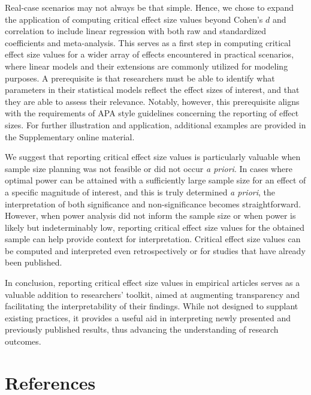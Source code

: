 \documentclass[
  man,floatsintext]{apa7}
\begin{document}
Real-case scenarios may not always be that simple. Hence, we chose to expand the application of computing critical effect size values beyond Cohen's \(d\) and correlation to include linear regression with both raw and standardized coefficients and meta-analysis. This serves as a first step in computing critical effect size values for a wider array of effects encountered in practical scenarios, where linear models and their extensions are commonly utilized for modeling purposes. A prerequisite is that researchers must be able to identify what parameters in their statistical models reflect the effect sizes of interest, and that they are able to assess their relevance. Notably, however, this prerequisite aligns with the requirements of APA style guidelines concerning the reporting of effect sizes. For further illustration and application, additional examples are provided in the Supplementary online material.

We suggest that reporting critical effect size values is particularly valuable when sample size planning was not feasible or did not occur \textit{a priori}. In cases where optimal power can be attained with a sufficiently large sample size for an effect of a specific magnitude of interest, and this is truly determined \textit{a priori}, the interpretation of both significance and non-significance becomes straightforward. However, when power analysis did not inform the sample size or when power is likely but indeterminably low, reporting critical effect size values for the obtained sample can help provide context for interpretation. Critical effect size values can be computed and interpreted even retrospectively or for studies that have already been published.

In conclusion, reporting critical effect size values in empirical articles serves as a valuable addition to researchers' toolkit, aimed at augmenting transparency and facilitating the interpretability of their findings. While not designed to supplant existing practices, it provides a useful aid in interpreting newly presented and previously published results, thus advancing the understanding of research outcomes.

\newpage

\section{References}\label{references}
\end{document}
